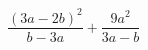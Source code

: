 \begin{ex}[type=expression]
	\begin{condition}
		\( \dfrac{(3a-2b)^2}{b-3a}+\dfrac{9a^2}{3a-b} \)
	\end{condition}
\end{ex}